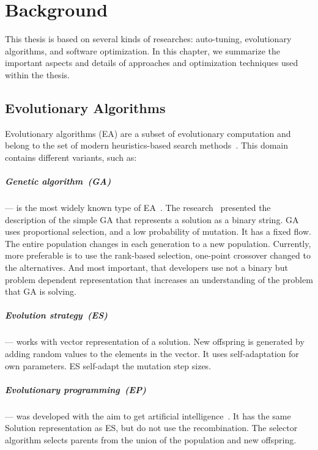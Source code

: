\chapter{Background}
\label{chapter:background}
This thesis is based on several kinds of researches: auto-tuning, evolutionary algorithms, and software optimization. In this chapter, we summarize the important aspects and details of approaches and optimization techniques used within the thesis.  

\section{Evolutionary Algorithms}
\label{sec:GeneticAlgorithm}

Evolutionary algorithms (EA) are a subset of evolutionary computation and belong to the set of modern heuristics-based search methods~\cite{vikhar16}.
This domain contains different variants, such as:
\paragraph{Genetic algorithm~(GA)} — is the most widely known type of EA~\cite{eiben03}. The research~\cite{deJong75} presented the description of the simple GA that represents a solution as a binary string. GA uses proportional selection, and a low probability of mutation. It has a fixed flow. The entire population changes in each generation to a new population. Currently, more preferable is to use the rank-based selection, one-point crossover changed to the alternatives. And most important, that developers use not a binary but problem dependent representation that increases an understanding of the problem that GA is solving.
\paragraph{Evolution strategy~(ES)} — works with vector representation of a solution. New offspring is generated by adding random values to the elements in the vector. It uses self-adaptation for own parameters. ES self-adapt the mutation step sizes.
\paragraph{Evolutionary programming~(EP)} — was developed with the aim to get artificial intelligence~\cite{eiben03}. It has the same Solution representation as ES, but do not use the recombination. The selector algorithm selects parents from the union of the population and new offspring.
